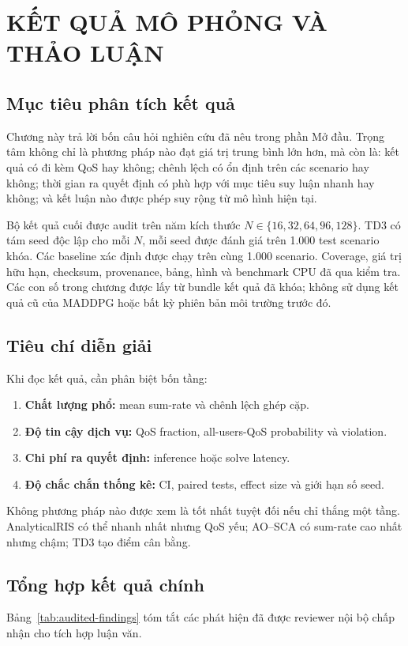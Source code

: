 \chapter{KẾT QUẢ MÔ PHỎNG VÀ THẢO LUẬN}
\label{chap:results}

\section{Mục tiêu phân tích kết quả}
Chương này trả lời bốn câu hỏi nghiên cứu đã nêu trong phần Mở đầu. Trọng tâm không chỉ là phương pháp nào đạt giá trị trung bình lớn hơn, mà còn là: kết quả có đi kèm QoS hay không; chênh lệch có ổn định trên các scenario hay không; thời gian ra quyết định có phù hợp với mục tiêu suy luận nhanh hay không; và kết luận nào được phép suy rộng từ mô hình hiện tại.

Bộ kết quả cuối được audit trên năm kích thước $N\in\{16,32,64,96,128\}$. TD3 có tám seed độc lập cho mỗi $N$, mỗi seed được đánh giá trên 1.000 test scenario khóa. Các baseline xác định được chạy trên cùng 1.000 scenario. Coverage, giá trị hữu hạn, checksum, provenance, bảng, hình và benchmark CPU đã qua kiểm tra. Các con số trong chương được lấy từ bundle kết quả đã khóa; không sử dụng kết quả cũ của MADDPG hoặc bất kỳ phiên bản môi trường trước đó.

\section{Tiêu chí diễn giải}
Khi đọc kết quả, cần phân biệt bốn tầng:
\begin{enumerate}[label=\arabic*)]
  \item \textbf{Chất lượng phổ:} mean sum-rate và chênh lệch ghép cặp.
  \item \textbf{Độ tin cậy dịch vụ:} QoS fraction, all-users-QoS probability và violation.
  \item \textbf{Chi phí ra quyết định:} inference hoặc solve latency.
  \item \textbf{Độ chắc chắn thống kê:} CI, paired tests, effect size và giới hạn số seed.
\end{enumerate}
Không phương pháp nào được xem là tốt nhất tuyệt đối nếu chỉ thắng một tầng. AnalyticalRIS có thể nhanh nhất nhưng QoS yếu; AO--SCA có sum-rate cao nhất nhưng chậm; TD3 tạo điểm cân bằng.

\section{Tổng hợp kết quả chính}
Bảng~\ref{tab:audited-findings} tóm tắt các phát hiện đã được reviewer nội bộ chấp nhận cho tích hợp luận văn.

